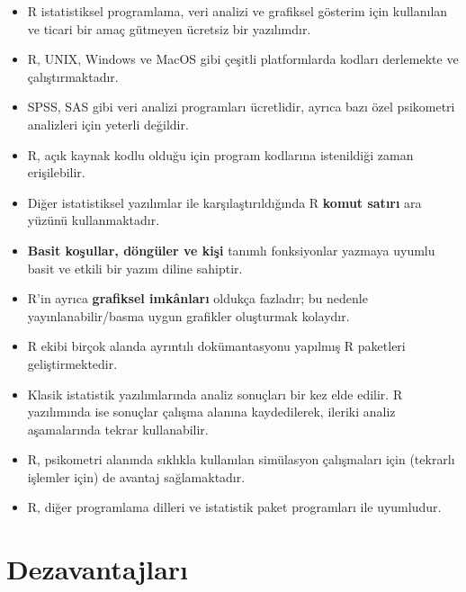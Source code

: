 \documentclass[
  oneside]{book}
\begin{document}
\begin{itemize}
\item
  R istatistiksel programlama, veri analizi ve grafiksel gösterim için kullanılan ve ticari bir amaç gütmeyen ücretsiz bir yazılımdır.
\item
  R, UNIX, Windows ve MacOS gibi çeşitli platformlarda kodları derlemekte ve çalıştırmaktadır.
\item
  SPSS, SAS gibi veri analizi programları ücretlidir, ayrıca bazı özel psikometri analizleri için yeterli değildir.
\item
  R, açık kaynak kodlu olduğu için program kodlarına istenildiği zaman erişilebilir.
\item
  Diğer istatistiksel yazılımlar ile karşılaştırıldığında R \textbf{komut satırı} ara yüzünü kullanmaktadır.
\item
  \textbf{Basit koşullar, döngüler ve kişi} tanımlı fonksiyonlar yazmaya uyumlu basit ve etkili bir yazım diline sahiptir.
\item
  R'in ayrıca \textbf{grafiksel imkânları} oldukça fazladır; bu nedenle yayınlanabilir/basma uygun grafikler oluşturmak kolaydır.
\item
  R ekibi birçok alanda ayrıntılı dokümantasyonu yapılmış R paketleri geliştirmektedir.
\item
  Klasik istatistik yazılımlarında analiz sonuçları bir kez elde edilir. R yazılımında ise sonuçlar çalışma alanına kaydedilerek, ileriki analiz aşamalarında tekrar kullanabilir.
\item
  R, psikometri alanında sıklıkla kullanılan simülasyon çalışmaları için (tekrarlı işlemler için) de avantaj sağlamaktadır.
\item
  R, diğer programlama dilleri ve istatistik paket programları ile uyumludur.
\end{itemize}

\hypertarget{dezavantajlarux131}{%
\section{Dezavantajları}\label{dezavantajlarux131}}
\end{document}
